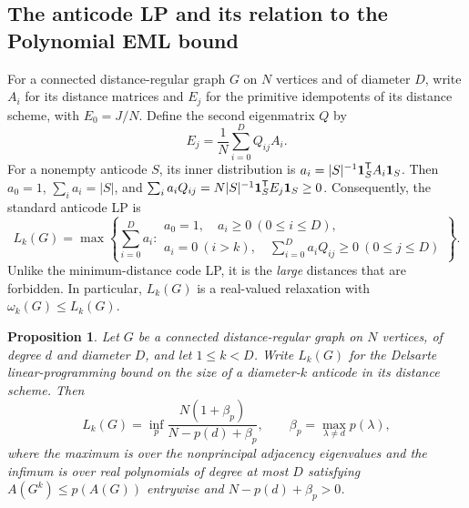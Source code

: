 \documentclass[11pt]{article}
\theoremstyle{plain}
\newtheorem{proposition}[theorem]{Proposition}
\numberwithin{equation}{section}
\def\1{\mbox{\boldmath $1$}}
\begin{document}
\subsection{The anticode LP and its relation to the Polynomial EML bound}
For a connected distance-regular graph $G$ on $N$ vertices and of diameter $D$, write $A_i$ for its distance matrices and $E_j$ for the primitive idempotents of its distance scheme, with $E_0=J/N$. Define the second eigenmatrix $Q$ by
\[
 E_j=\frac1N\sum_{i=0}^{D}Q_{ij}A_i.
\]
For a nonempty anticode $S$, its inner distribution is
$a_i=|S|^{-1}\1_S^{\mathsf T}A_i\1_S$. Then $a_0=1$,
$\sum_i a_i=|S|$, and
$\sum_i a_iQ_{ij}=N|S|^{-1}\1_S^{\mathsf T}E_j\1_S\ge0$.
Consequently, the standard anticode LP is~\cite{Delsarte_1973,Tanaka_2012}
\begin{equation}\label{eq:coding-primal}
 L_k(G)=\max\left\{\sum_{i=0}^{D}a_i:
 \begin{array}{l}
 a_0=1,\quad a_i\ge0\ (0\le i\le D),\\
 a_i=0\ (i>k),\quad
 \sum_{i=0}^{D}a_iQ_{ij}\ge0\ (0\le j\le D)
 \end{array}\right\}.
\end{equation}
Unlike the minimum-distance code LP, it is the \emph{large} distances that are forbidden. In particular, $L_k(G)$ is a real-valued relaxation with $\omega_k(G)\le L_k(G)$.%

\begin{proposition}\label{prop:coding-delsarte}
Let $G$ be a connected distance-regular graph on $N$ vertices, of degree $d$ and diameter $D$, and let $1\le k<D$. Write $L_k(G)$ for the Delsarte linear-programming bound on the size of a diameter-$k$ anticode in its distance scheme. Then
\begin{equation}\label{eq:coding-delsarte}
 L_k(G)=\inf_p
 \frac{N(1+\beta_p)}{N-p(d)+\beta_p},
 \qquad
 \beta_p=\max_{\lambda\ne d}p(\lambda),
\end{equation}
where the maximum is over the nonprincipal adjacency eigenvalues and the infimum is over real polynomials of degree at most $D$ satisfying
$A(G^k)\le p(A(G))$ entrywise and $N-p(d)+\beta_p>0$.
\end{proposition}
\end{document}
